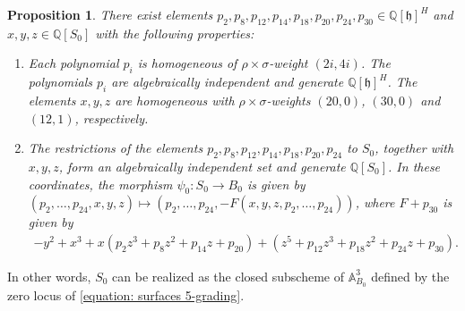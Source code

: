 \documentclass{article} %
\newtheorem{proposition}{Proposition}[section]
\numberwithin{equation}{section}
\theoremstyle{definition}
\newcommand{\A}{\mathbb{A}}
\newcommand{\Q}{\mathbb{Q}}
\newcommand{\frakh}{\mathfrak h}
\begin{document}
\begin{proposition}\label{proposition: determination surface slice 5-grading}
    There exist elements $p_2, p_8, p_{12}, p_{14}, p_{18}, p_{20}, p_{24}, p_{30} \in \Q[\frakh]^H$ and $x,y,z\in \Q[S_0]$ with the following properties:
    \begin{enumerate}
        \item Each polynomial $p_i$ is homogeneous of $\rho\times \sigma$-weight $(2i,4i)$. The polynomials $p_i$ are algebraically independent and generate $\Q[\frakh]^H$. The elements $x, y, z$ are homogeneous with $\rho\times \sigma$-weights $(20, 0)$, $(30,0)$ and $(12,1)$, respectively.
        \item The restrictions of the elements $p_2, p_8, p_{12}, p_{14}, p_{18}, p_{20}, p_{24}$ to $S_0$, together with $x, y, z$, form an algebraically independent set and generate $\Q[S_0]$. 
        In these coordinates, the morphism $\psi_0 : S_0 \rightarrow  B_0$ is given by $(p_2, \dots, p_{24},x,y,z)\mapsto (p_2, \dots, p_{24},-F(x,y,z,p_2, \dots, p_{24}))$, where $F+p_{30}$ is given by 
    \begin{align}\label{equation: surfaces 5-grading}
    -y^2+  x^3 + x(p_2z^3 + p_8z^2 + p_{14}z + p_{20}) + (z^5+ p_{12}z^3 + p_{18}z^2 + p_{24}z + p_{30}).
    \end{align}
    \end{enumerate}
\end{proposition}
In other words, $S_0$ can be realized as the closed subscheme of $\A^3_{B_0}$ defined by the zero locus of \eqref{equation: surfaces 5-grading}.
\end{document}
